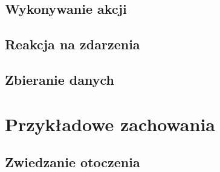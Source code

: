 \subsection{Wykonywanie akcji}
\subsection{Reakcja na zdarzenia}
\subsection{Zbieranie danych}


\section{Przykładowe zachowania}

\subsection{Zwiedzanie otoczenia}

